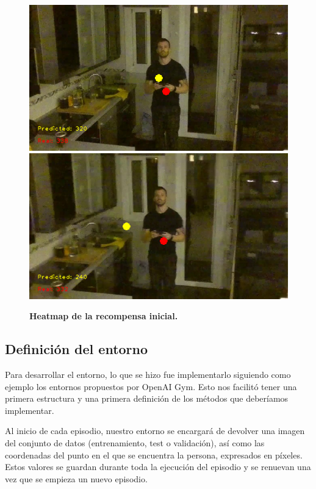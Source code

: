 \begin{figure}
	\centering
	\includegraphics[scale=0.1]{figuras/recompensa/recompensa_maxima.png}
	\includegraphics[scale=0.1]{figuras/recompensa/recompensa_no_maxima.png}
	\caption[Heatmap de la recompensa inicial]{\textbf{Heatmap de la recompensa inicial.}}
	\label{fig-recompensa-inicial}
\end{figure}

\subsection{Definición del entorno}
\label{definicion-del-entorno}

Para desarrollar el entorno, lo que se hizo fue implementarlo siguiendo como ejemplo los entornos propuestos por OpenAI Gym. Esto nos facilitó tener una primera estructura y una primera definición de los métodos que deberíamos implementar.
\medskip

Al inicio de cada episodio, nuestro entorno se encargará de devolver una imagen del conjunto de datos (entrenamiento, test o validación), así como las coordenadas del punto en el que se encuentra la persona, expresados en píxeles. Estos valores se guardan durante toda la ejecución del episodio y se renuevan una vez que se empieza un nuevo episodio.
\medskip


